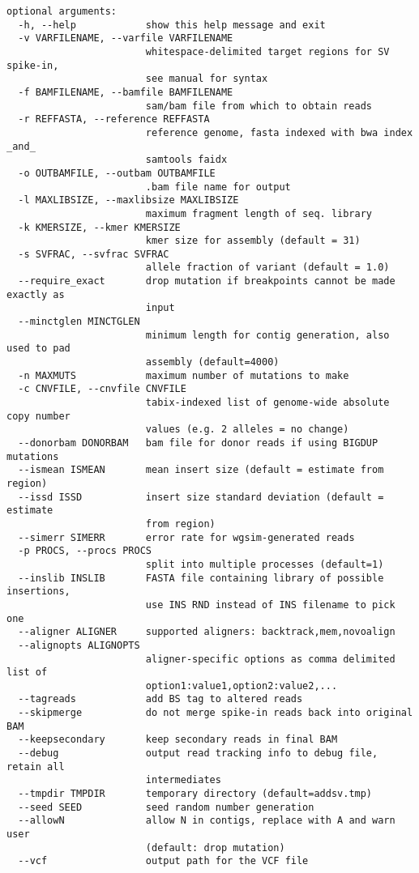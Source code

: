 \documentclass[letterpaper,11pt]{article}
\begin{document}
\begin{verbatim}
optional arguments:
  -h, --help            show this help message and exit
  -v VARFILENAME, --varfile VARFILENAME
                        whitespace-delimited target regions for SV spike-in,
                        see manual for syntax
  -f BAMFILENAME, --bamfile BAMFILENAME
                        sam/bam file from which to obtain reads
  -r REFFASTA, --reference REFFASTA
                        reference genome, fasta indexed with bwa index _and_
                        samtools faidx
  -o OUTBAMFILE, --outbam OUTBAMFILE
                        .bam file name for output
  -l MAXLIBSIZE, --maxlibsize MAXLIBSIZE
                        maximum fragment length of seq. library
  -k KMERSIZE, --kmer KMERSIZE
                        kmer size for assembly (default = 31)
  -s SVFRAC, --svfrac SVFRAC
                        allele fraction of variant (default = 1.0)
  --require_exact       drop mutation if breakpoints cannot be made exactly as
                        input
  --minctglen MINCTGLEN
                        minimum length for contig generation, also used to pad
                        assembly (default=4000)
  -n MAXMUTS            maximum number of mutations to make
  -c CNVFILE, --cnvfile CNVFILE
                        tabix-indexed list of genome-wide absolute copy number
                        values (e.g. 2 alleles = no change)
  --donorbam DONORBAM   bam file for donor reads if using BIGDUP mutations
  --ismean ISMEAN       mean insert size (default = estimate from region)
  --issd ISSD           insert size standard deviation (default = estimate
                        from region)
  --simerr SIMERR       error rate for wgsim-generated reads
  -p PROCS, --procs PROCS
                        split into multiple processes (default=1)
  --inslib INSLIB       FASTA file containing library of possible insertions,
                        use INS RND instead of INS filename to pick one
  --aligner ALIGNER     supported aligners: backtrack,mem,novoalign
  --alignopts ALIGNOPTS
                        aligner-specific options as comma delimited list of
                        option1:value1,option2:value2,...
  --tagreads            add BS tag to altered reads
  --skipmerge           do not merge spike-in reads back into original BAM
  --keepsecondary       keep secondary reads in final BAM
  --debug               output read tracking info to debug file, retain all
                        intermediates
  --tmpdir TMPDIR       temporary directory (default=addsv.tmp)
  --seed SEED           seed random number generation
  --allowN              allow N in contigs, replace with A and warn user
                        (default: drop mutation)
  --vcf                 output path for the VCF file
  
\end{verbatim}
\end{document}
